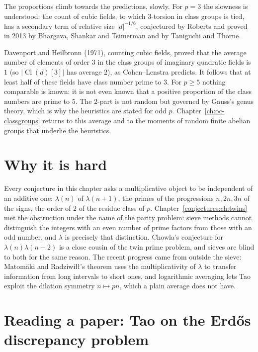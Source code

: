 The proportions climb towards the predictions, slowly. For $p=3$ the slowness is understood: the count of cubic fields, to which $3$-torsion in class
groups is tied, has a secondary term of relative size $|d|^{-1/6}$, conjectured by Roberts and proved in 2013 by Bhargava, Shankar and Tsimerman and by
Taniguchi and Thorne.

\begin{remark}\label{conjectures:rem:clknown}
Davenport and Heilbronn (1971), counting cubic fields, proved that the average number of elements of order $3$ in the class groups of imaginary quadratic
fields is $1$ (so $|\operatorname{Cl}(d)[3]|$ has average $2$), as Cohen--Lenstra predicts. It follows that at least half of these fields have class number prime to $3$. For
$p\ge5$ nothing comparable is known: it is not even known that a positive proportion of the class numbers are prime to $5$. The $2$-part is not random but governed by Gauss's genus
theory, which is why the heuristics are stated for odd $p$. Chapter~\ref{ch:oc-classgroups} returns to this average and to the moments of random finite abelian groups that underlie the heuristics.
\end{remark}

\section{Why it is hard}

Every conjecture in this chapter asks a multiplicative object to be independent of an additive one: $\lambda(n)$ of $\lambda(n+1)$, the primes of the
progressions $n,2n,3n$ of the signs, the order of $2$ of the residue class of $p$. Chapter~\ref{conjectures:ch:twins} met the obstruction under the name of the parity
problem: sieve methods cannot distinguish the integers with an even number of prime factors from those with an odd number, and $\lambda$ is precisely that
distinction. Chowla's conjecture for $\lambda(n)\lambda(n+2)$ is a close cousin of the twin prime problem, and sieves are blind to both for the same reason. The recent progress came from
outside the sieve: Matom\"aki and Radziwi\l\l's theorem uses the multiplicativity of $\lambda$ to transfer information from long intervals to short ones, and
logarithmic averaging lets Tao exploit the dilation symmetry $n\mapsto pn$, which a plain average does not have.

\section{Reading a paper: Tao on the Erd\H os discrepancy problem}

